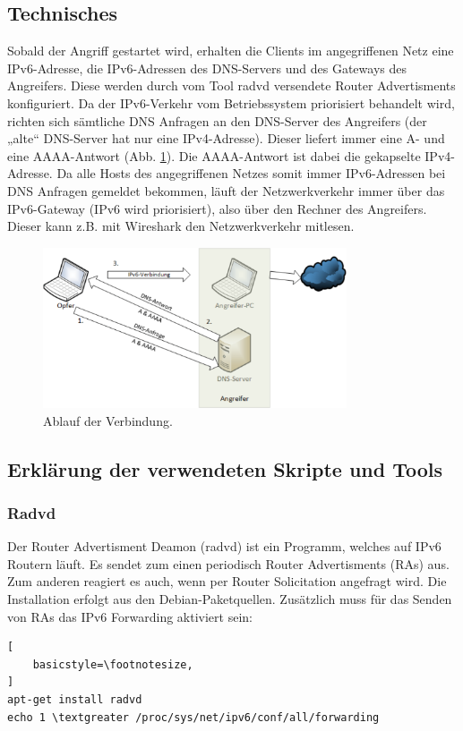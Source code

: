 \subsection*{Technisches}
Sobald der Angriff gestartet wird, erhalten die Clients im angegriffenen Netz eine IPv6-Adresse, die IPv6-Adressen des DNS-Servers und des Gateways des Angreifers. Diese werden durch vom Tool radvd versendete Router Advertisments konfiguriert. Da der IPv6-Verkehr vom Betriebssystem priorisiert behandelt wird, richten sich sämtliche DNS Anfragen an den DNS-Server des Angreifers (der „alte“ DNS-Server hat nur eine IPv4-Adresse). 
Dieser liefert immer eine A- und eine AAAA-Antwort (Abb. \ref{fig:fakeIPv6DNS}). Die AAAA-Antwort ist dabei die gekapselte IPv4-Adresse. Da alle Hosts des angegriffenen Netzes somit immer IPv6-Adressen bei DNS Anfragen gemeldet bekommen, läuft der Netzwerkverkehr immer über das IPv6-Gateway (IPv6 wird priorisiert), also über den Rechner des Angreifers. Dieser kann z.B. mit Wireshark den Netzwerkverkehr mitlesen.

\begin{figure}[h!]
	\centering
	\includegraphics[width=0.8\textwidth]{bilder/fakeIPv6/fakeIPv6DNS.pdf}
	\caption{Ablauf der Verbindung.}
	\label{fig:fakeIPv6DNS}
\end{figure}

\subsection*{Erklärung der verwendeten Skripte und Tools}

\subsubsection*{Radvd}
Der Router Advertisment Deamon (radvd) ist ein Programm, welches auf IPv6 Routern läuft. Es sendet zum einen periodisch Router Advertisments (RAs) aus. Zum anderen reagiert es auch, wenn per Router Solicitation angefragt wird. Die Installation erfolgt aus den Debian-Paketquellen. Zusätzlich muss für das Senden von RAs das IPv6 Forwarding aktiviert sein:
\lstset{language=bash}
\begin{lstlisting}[
	basicstyle=\footnotesize,
]
apt-get install radvd
echo 1 \textgreater /proc/sys/net/ipv6/conf/all/forwarding
\end{lstlisting}

